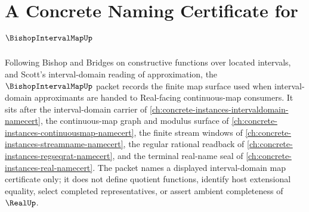 \chapter{A Concrete Naming Certificate for $\BishopIntervalMapUp$}
\label{ch:concrete-instances-bishop-interval-map-namecert}

Following Bishop and Bridges on constructive functions over located intervals, and Scott's interval-domain reading of approximation, the $\BishopIntervalMapUp$ packet records the finite map surface used when interval-domain approximants are handed to Real-facing continuous-map consumers. It sits after the interval-domain carrier of \autoref{ch:concrete-instances-intervaldomain-namecert}, the continuous-map graph and modulus surface of \autoref{ch:concrete-instances-continuousmap-namecert}, the finite stream windows of \autoref{ch:concrete-instances-streamname-namecert}, the regular rational readback of \autoref{ch:concrete-instances-regseqrat-namecert}, and the terminal real-name seal of \autoref{ch:concrete-instances-real-namecert}. The packet names a displayed interval-domain map certificate only; it does not define quotient functions, identify host extensional equality, select completed representatives, or assert ambient completeness of $\RealUp$.

